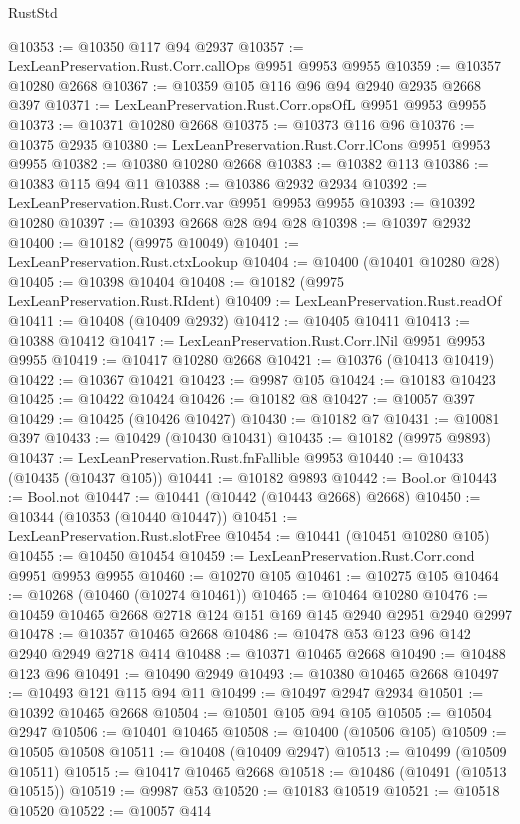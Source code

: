 \begin{lexlean}{RustStd}
\begin{coremodule}
@10353 := @10350 @117 @94 @2937
@10357 := LexLeanPreservation.Rust.Corr.callOps @9951 @9953 @9955
@10359 := @10357 @10280 @2668
@10367 := @10359 @105 @116 @96 @94 @2940 @2935 @2668 @397
@10371 := LexLeanPreservation.Rust.Corr.opsOfL @9951 @9953 @9955
@10373 := @10371 @10280 @2668
@10375 := @10373 @116 @96
@10376 := @10375 @2935
@10380 := LexLeanPreservation.Rust.Corr.lCons @9951 @9953 @9955
@10382 := @10380 @10280 @2668
@10383 := @10382 @113
@10386 := @10383 @115 @94 @11
@10388 := @10386 @2932 @2934
@10392 := LexLeanPreservation.Rust.Corr.var @9951 @9953 @9955
@10393 := @10392 @10280
@10397 := @10393 @2668 @28 @94 @28
@10398 := @10397 @2932
@10400 := @10182 (@9975 @10049)
@10401 := LexLeanPreservation.Rust.ctxLookup
@10404 := @10400 (@10401 @10280 @28)
@10405 := @10398 @10404
@10408 := @10182 (@9975 LexLeanPreservation.Rust.RIdent)
@10409 := LexLeanPreservation.Rust.readOf
@10411 := @10408 (@10409 @2932)
@10412 := @10405 @10411
@10413 := @10388 @10412
@10417 := LexLeanPreservation.Rust.Corr.lNil @9951 @9953 @9955
@10419 := @10417 @10280 @2668
@10421 := @10376 (@10413 @10419)
@10422 := @10367 @10421
@10423 := @9987 @105
@10424 := @10183 @10423
@10425 := @10422 @10424
@10426 := @10182 @8
@10427 := @10057 @397
@10429 := @10425 (@10426 @10427)
@10430 := @10182 @7
@10431 := @10081 @397
@10433 := @10429 (@10430 @10431)
@10435 := @10182 (@9975 @9893)
@10437 := LexLeanPreservation.Rust.fnFallible @9953
@10440 := @10433 (@10435 (@10437 @105))
@10441 := @10182 @9893
@10442 := Bool.or
@10443 := Bool.not
@10447 := @10441 (@10442 (@10443 @2668) @2668)
@10450 := @10344 (@10353 (@10440 @10447))
@10451 := LexLeanPreservation.Rust.slotFree
@10454 := @10441 (@10451 @10280 @105)
@10455 := @10450 @10454
@10459 := LexLeanPreservation.Rust.Corr.cond @9951 @9953 @9955
@10460 := @10270 @105
@10461 := @10275 @105
@10464 := @10268 (@10460 (@10274 @10461))
@10465 := @10464 @10280
@10476 := @10459 @10465 @2668 @2718 @124 @151 @169 @145 @2940 @2951 @2940 @2997
@10478 := @10357 @10465 @2668
@10486 := @10478 @53 @123 @96 @142 @2940 @2949 @2718 @414
@10488 := @10371 @10465 @2668
@10490 := @10488 @123 @96
@10491 := @10490 @2949
@10493 := @10380 @10465 @2668
@10497 := @10493 @121 @115 @94 @11
@10499 := @10497 @2947 @2934
@10501 := @10392 @10465 @2668
@10504 := @10501 @105 @94 @105
@10505 := @10504 @2947
@10506 := @10401 @10465
@10508 := @10400 (@10506 @105)
@10509 := @10505 @10508
@10511 := @10408 (@10409 @2947)
@10513 := @10499 (@10509 @10511)
@10515 := @10417 @10465 @2668
@10518 := @10486 (@10491 (@10513 @10515))
@10519 := @9987 @53
@10520 := @10183 @10519
@10521 := @10518 @10520
@10522 := @10057 @414

\end{coremodule}
\end{lexlean}
